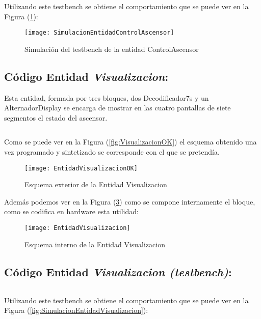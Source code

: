     Utilizando este testbench se obtiene el comportamiento que se puede ver en la Figura (\ref{fig:SimulacionEntidadControlAscensor}):

    \begin{figure}[H]
		    \centering
		    \texttt{[image: SimulacionEntidadControlAscensor]}
		    \caption{Simulación del testbench de la entidad ControlAscensor}
		    \label{fig:SimulacionEntidadControlAscensor}
	\end{figure}

\subsection{Código Entidad \textit{Visualizacion}:} \label{code:Visualizacion}

Esta entidad, formada por tres bloques, dos Decodificador7s y un AlternadorDisplay se encarga de mostrar en las cuatro pantallas de siete segmentos el estado del ascensor. \\ 
	\inputminted[frame=lines,fontsize=\footnotesize,linenos]{vhdl}{CodeFiles/EntidadVisualizacion.vhd}

	Como se puede ver en la Figura (\ref{fig:VisualizacionOK}) el esquema obtenido una vez programado y sintetizado se corresponde con el que se pretendía.
    \begin{figure}[H]
		    \centering
		    \texttt{[image: EntidadVisualizacionOK]}
		    \caption{Esquema exterior de la Entidad Visualizacion}
		    \label{fig:EntidadVisualizacionOK}
	\end{figure}
    Además podemos ver en la Figura (\ref{fig:EntidadVisualizacionImplementacion}) como se compone internamente el bloque, como se codifica en hardware esta utilidad:
    \begin{figure}[H]
		    \centering
		    \texttt{[image: EntidadVisualizacion]}
		    \caption{Esquema interno de la Entidad Visualizacion}
		    \label{fig:EntidadVisualizacionImplementacion}
	\end{figure}

\subsection{Código Entidad \textit{Visualizacion (testbench)}:} \label{code:Visualizacion_tb}
	\inputminted[frame=lines,fontsize=\footnotesize,linenos]{vhdl}{CodeFiles/EntidadVisualizacion_tb.vhd}

    Utilizando este testbench se obtiene el comportamiento que se puede ver en la Figura (\ref{fig:SimulacionEntidadVisualizacion}):

